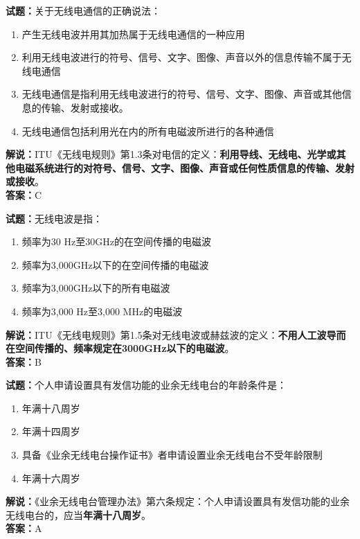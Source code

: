 \documentclass{ctexbook}
\begin{document}
\bigskip




\noindent\textbf{试题：}关于无线电通信的正确说法：
\begin{enumerate}[leftmargin=3em]
\item 产生无线电波并用其加热属于无线电通信的一种应用
\item 利用无线电波进行的符号、信号、文字、图像、声音以外的信息传输不属于无线电通信
\item 无线电通信是指利用无线电波进行的符号、信号、文字、图像、声音或其他信息的传输、发射或接收。
\item 无线电通信包括利用光在内的所有电磁波所进行的各种通信
\end{enumerate}
\noindent\textbf{解说：}ITU《无线电规则》第1.3条对电信的定义：\textbf{利用导线、无线电、光学或其他电磁系统进行的对符号、信号、文字、图像、声音或任何性质信息的传输、发射或接收}。\\\noindent\textbf{答案：}C


\bigskip




\noindent\textbf{试题：}无线电波是指：
\begin{enumerate}[leftmargin=3em]
\item 频率为30 \si{Hz}至30\unit{\GHz}的在空间传播的电磁波
\item 频率为3,000\unit{\GHz}以下的在空间传播的电磁波
\item 频率为3,000\unit{\GHz}以下的所有电磁波
\item 频率为3,000 \si{Hz}至3,000 \unit{\MHz}的电磁波
\end{enumerate}
\noindent\textbf{解说：}ITU《无线电规则》第1.5条对无线电波或赫兹波的定义：\textbf{不用人工波导而在空间传播的、频率规定在3000\unit{\GHz}以下的电磁波}。\\\noindent\textbf{答案：}B

\bigskip




\noindent\textbf{试题：}个人申请设置具有发信功能的业余无线电台的年龄条件是：
\begin{enumerate}[leftmargin=3em]
\item 年满十八周岁
\item 年满十四周岁
\item 具备《业余无线电台操作证书》者申请设置业余无线电台不受年龄限制
\item 年满十六周岁
\end{enumerate}
\noindent\textbf{解说：}《业余无线电台管理办法》第六条规定：个人申请设置具有发信功能的业余无线电台的，应当\textbf{年满十八周岁}。\\\noindent\textbf{答案：}A
\end{document}
